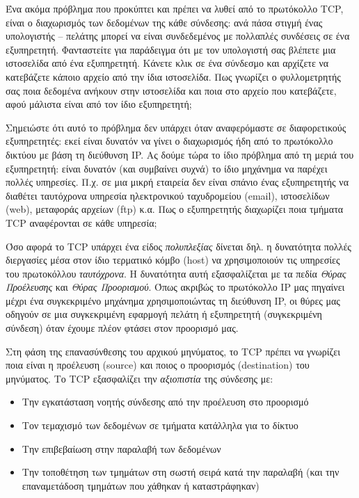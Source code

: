 Ένα ακόμα πρόβλημα που προκύπτει και πρέπει να λυθεί από το πρωτόκολλο TCP, είναι ο διαχωρισμός των δεδομένων της κάθε σύνδεσης: ανά πάσα στιγμή ένας υπολογιστής -- πελάτης μπορεί να είναι συνδεδεμένος με πολλαπλές συνδέσεις σε ένα εξυπηρετητή. Φανταστείτε για παράδειγμα ότι με τον υπολογιστή σας βλέπετε μια ιστοσελίδα από ένα εξυπηρετητή. Κάνετε κλικ σε ένα σύνδεσμο και αρχίζετε να κατεβάζετε κάποιο αρχείο από την ίδια ιστοσελίδα. Πως γνωρίζει ο φυλλομετρητής σας ποια δεδομένα ανήκουν στην ιστοσελίδα και ποια στο αρχείο που κατεβάζετε, αφού μάλιστα είναι από τον ίδιο εξυπηρετητή;

Σημειώστε ότι αυτό το πρόβλημα δεν υπάρχει όταν αναφερόμαστε σε διαφορετικούς εξυπηρετητές: εκεί είναι δυνατόν να γίνει ο διαχωρισμός ήδη από το πρωτόκολλο δικτύου με βάση τη διεύθυνση IP. Ας δούμε τώρα το ίδιο πρόβλημα από τη μεριά του εξυπηρετητή: είναι δυνατόν (και συμβαίνει συχνά) το ίδιο μηχάνημα να παρέχει πολλές υπηρεσίες. Π.χ. σε μια μικρή εταιρεία δεν είναι σπάνιο ένας εξυπηρετητής να διαθέτει ταυτόχρονα υπηρεσία ηλεκτρονικού ταχυδρομείου (email), ιστοσελίδων (web), μεταφοράς αρχείων (ftp) κ.α. Πως ο εξυπηρετητής διαχωρίζει ποια τμήματα TCP αναφέρονται σε κάθε υπηρεσία;

Όσο αφορά το TCP υπάρχει ένα είδος \emph{πολυπλεξίας} δίνεται δηλ. η δυνατότητα πολλές διεργασίες μέσα στον ίδιο τερματικό κόμβο (host) να χρησιμοποιούν τις υπηρεσίες του πρωτοκόλλου \emph{ταυτόχρονα}. Η δυνατότητα αυτή εξασφαλίζεται με τα πεδία \emph{Θύρας Προέλευσης} και \emph{Θύρας Προορισμού}. Όπως ακριβώς το πρωτόκολλο IP μας πηγαίνει μέχρι ένα συγκεκριμένο μηχάνημα χρησιμοποιώντας τη διεύθυνση IP, οι θύρες μας οδηγούν σε μια συγκεκριμένη εφαρμογή πελάτη ή εξυπηρετητή (συγκεκριμένη σύνδεση) όταν έχουμε πλέον φτάσει στον προορισμό μας.

Στη φάση της επανασύνθεσης του αρχικού μηνύματος, το TCP πρέπει να γνωρίζει ποια είναι η προέλευση (source) και ποιος ο προορισμός (destination) του μηνύματος. Το TCP εξασφαλίζει την \emph{αξιοπιστία} της σύνδεσης με:

\begin{itemize}
\item Την εγκατάσταση νοητής σύνδεσης από την προέλευση στο προορισμό
\item Τον τεμαχισμό των δεδομένων σε τμήματα κατάλληλα για το δίκτυο
\item Την επιβεβαίωση στην παραλαβή των δεδομένων
\item Την τοποθέτηση των τμημάτων στη σωστή σειρά κατά την παραλαβή (και την επαναμετάδοση τμημάτων που χάθηκαν ή καταστράφηκαν)
\end{itemize}

